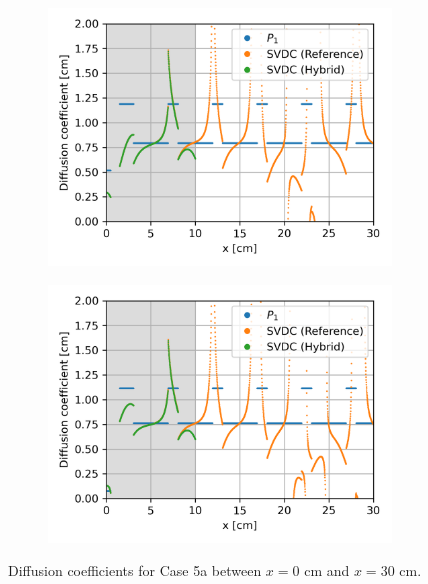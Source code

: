 \begin{frame}
\begin{figure}
\begin{subfigure}[t]{.35\textwidth}
      \centering
      \includegraphics[width=\textwidth]{images/case-5a-group-3-diffcoef}
      \label{fig:c5ag3dc}
    \end{subfigure}
    \begin{subfigure}[t]{.35\textwidth}
      \centering
      \includegraphics[width=\textwidth]{images/case-5a-group-4-diffcoef}
      \label{fig:c5ag4dc}
    \end{subfigure}
    \caption{Diffusion coefficients for Case 5a between $x=0$ cm and $x=30$ cm.}
    \label{fig:c5adiffcoef}
  \end{figure}
\end{frame}

